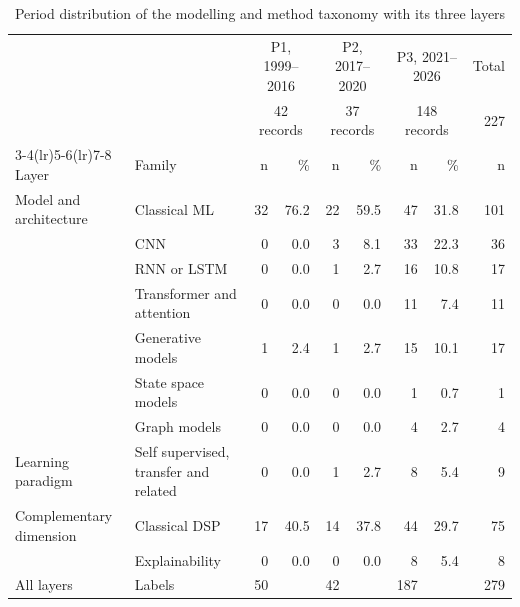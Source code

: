 \begin{table}[!t]
\caption{Period distribution of the modelling and method taxonomy with its three layers}
\label{tab:taxonomy}
\centering
\footnotesize
\begin{tabular}{@{}llrrrrrrr@{}}
\toprule
 & & \multicolumn{2}{c}{P1, 1999--2016} & \multicolumn{2}{c}{P2, 2017--2020} & \multicolumn{2}{c}{P3, 2021--2026} & Total \\
 & & \multicolumn{2}{c}{42 records} & \multicolumn{2}{c}{37 records} & \multicolumn{2}{c}{148 records} & 227 \\
\cmidrule(lr){3-4}\cmidrule(lr){5-6}\cmidrule(lr){7-8}
Layer & Family & n & \% & n & \% & n & \% & n \\
\midrule
Model and architecture & Classical ML & 32 & 76.2 & 22 & 59.5 & 47 & 31.8 & 101 \\
 & CNN & 0 & 0.0 & 3 & 8.1 & 33 & 22.3 & 36 \\
 & RNN or LSTM & 0 & 0.0 & 1 & 2.7 & 16 & 10.8 & 17 \\
 & Transformer and attention & 0 & 0.0 & 0 & 0.0 & 11 & 7.4 & 11 \\
 & Generative models & 1 & 2.4 & 1 & 2.7 & 15 & 10.1 & 17 \\
 & State space models & 0 & 0.0 & 0 & 0.0 & 1 & 0.7 & 1 \\
 & Graph models & 0 & 0.0 & 0 & 0.0 & 4 & 2.7 & 4 \\
Learning paradigm & Self supervised, transfer and related & 0 & 0.0 & 1 & 2.7 & 8 & 5.4 & 9 \\
Complementary dimension & Classical DSP & 17 & 40.5 & 14 & 37.8 & 44 & 29.7 & 75 \\
 & Explainability & 0 & 0.0 & 0 & 0.0 & 8 & 5.4 & 8 \\
\midrule
All layers & Labels & 50 & & 42 & & 187 & & 279 \\
\bottomrule
\end{tabular}
\end{table}
